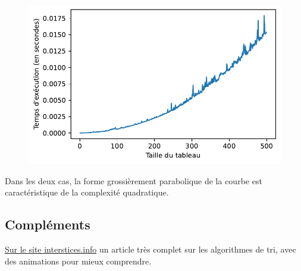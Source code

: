 \documentclass[
  a4paper,
  DIV=11,
  numbers=noendperiod]{scrartcl}
\begin{document}
\begin{figure}[H]

{\centering \includegraphics{tris_files/figure-pdf/cell-7-output-1.pdf}

}

\end{figure}

Dans les deux cas, la forme grossièrement parabolique de la courbe est
caractéristique de la complexité quadratique.

\hypertarget{compluxe9ments}{%
\subsection{Compléments}\label{compluxe9ments}}

\href{https://interstices.info/les-algorithmes-de-tri/}{Sur le site
interstices.info} un article très complet sur les algorithmes de tri,
avec des animations pour mieux comprendre.
\end{document}
